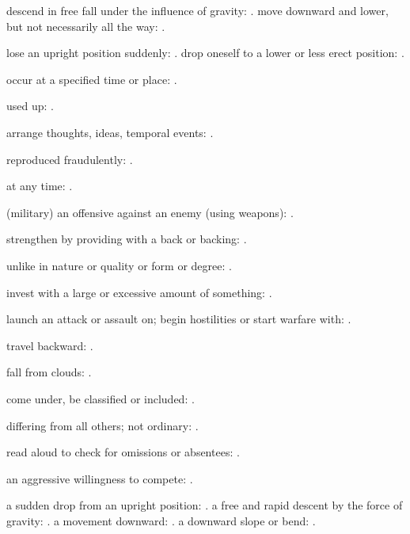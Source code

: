   descend in free fall under the influence of gravity: . move downward and lower, but not necessarily all the way:   .

  lose an upright position suddenly:   . drop oneself to a lower or less erect position: .

  occur at a specified time or place: .

  used up: .

  arrange thoughts, ideas, temporal events:   .

  reproduced fraudulently:   .

  at any time:   .

  (military) an offensive against an enemy (using weapons):   .

  strengthen by providing with a back or backing: .

  unlike in nature or quality or form or degree: .

  invest with a large or excessive amount of something: .

  launch an attack or assault on; begin hostilities or start warfare with:   .

  travel backward: .

  fall from clouds:   .

  come under, be classified or included:   .

  differing from all others; not ordinary: .

  read aloud to check for omissions or absentees: .

  an aggressive willingness to compete: .

  a sudden drop from an upright position:   . a free and rapid descent by the force of gravity:   . a movement downward: . a downward slope or bend:   .

